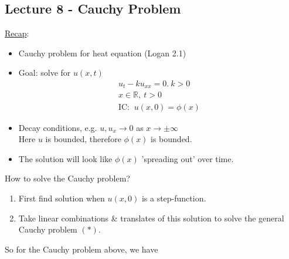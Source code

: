 \documentclass[12pt, letterpaper]{article}
\begin{document}
\subsection{Lecture 8 - Cauchy Problem}
\underline{Recap}:
\begin{itemize}
    \item Cauchy problem for heat equation (Logan 2.1)
    \item Goal: solve for $u(x,t)$
    \begin{align*}
        u_t - ku_{xx} = 0.\ k > 0 \\
        x \in \mathbb{R},\ t > 0 \tag{$\ast$}\\
        \text{IC: }\ u(x,0) = \phi(x)
    \end{align*}
    \item Decay conditions, e.g. $u,u_x \rightarrow 0 $ as $x \rightarrow \pm \infty$ \\
    Here $u$ is bounded, therefore $\phi(x)$ is bounded.
    \item The solution will look like $\phi(x)$ 'spreading out' over time.
\end{itemize}
How to solve the Cauchy problem?
\begin{enumerate}
    \item First find solution when $u(x,0)$ is a step-function.
    \item Take linear combinations \& translates of this solution to solve the general
    Cauchy problem $(\ast)$.
\end{enumerate}
So for the Cauchy problem above, we have 
\end{document}
